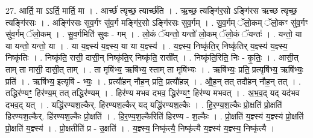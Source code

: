 \documentclass[17pt]{extarticle}
\begin{document}
27. आर्ति॒ मा ऽऽर्ति॒ मार्ति॒ मा । . आर्च्छ॑ त्यृच्छ॒ त्यार्च्छ॑ति । . ऋ॒च्छ॒ त्यङ्गि॑र॒सो ऽङ्गि॑रस ऋच्छ त्यृच्छ॒ त्यङ्गि॑रसः । . अङ्गि॑रसः सुव॒र्गꣳ सु॑व॒र्ग मङ्गि॑र॒सो ऽङ्गि॑रसः सुव॒र्गम् । . सु॒व॒र्गम् ॅलो॒कम् ॅलो॒कꣳ सु॑व॒र्गꣳ सु॑व॒र्गम् ॅलो॒कम् । . सु॒व॒र्गमिति॑ सुवः - गम् । . लो॒कं ॅयन्तो॒ यन्तो॑ लो॒कम् ॅलो॒कं ॅयन्तः॑ । . यन्तो॒ या या यन्तो॒ यन्तो॒ या । . या य॒ज्ञ्स्य॑ य॒ज्ञ्स्य॒ या या य॒ज्ञ्स्य॑ । . य॒ज्ञ्स्य॒ निष्कृ॑ति॒र् निष्कृ॑तिर् य॒ज्ञ्स्य॑ य॒ज्ञ्स्य॒ निष्कृ॑तिः । . निष्कृ॑ति॒ रासी॒ दासी॒न् निष्कृ॑ति॒र् निष्कृ॑ति॒ रासी᳚त् । . निष्कृ॑ति॒रिति॒ निः - कृ॒तिः॒ । . आसी॒त् ताम् ता मासी॒ दासी॒त् ताम् । . ता मृषि॑भ्य॒ ऋषि॑भ्य॒ स्ताम् ता मृषि॑भ्यः । . ऋषि॑भ्यः॒ प्रति॒ प्रत्यृषि॑भ्य॒ ऋषि॑भ्यः॒ प्रति॑ । . ऋषि॑भ्य॒ इत्यृषि॑ - भ्यः॒ । . प्रत्यौ॑हन् नौह॒न् प्रति॒ प्रत्यौ॑हन्न् । . औ॒ह॒न् तत् तदौ॑हन् नौह॒न् तत् । . तद्धिर॑ण्यꣳ॒॒ हिर॑ण्य॒म् तत् तद्धिर॑ण्यम् । . हिर॑ण्य मभव दभव॒ द्धिर॑ण्यꣳ॒॒ हिर॑ण्य मभवत् । . अ॒भ॒व॒द् यद् यद॑भव दभव॒द् यत् । . यद्धि॑रण्यश॒ल्कैर्. हि॑रण्यश॒ल्कैर् यद् यद्धि॑रण्यश॒ल्कैः । . हि॒र॒ण्य॒श॒ल्कैः प्रो॒क्षति॑ प्रो॒क्षति॑ हिरण्यश॒ल्कैर्. हि॑रण्यश॒ल्कैः प्रो॒क्षति॑ । . हि॒र॒ण्य॒श॒ल्कैरिति॑ हिरण्य - श॒ल्कैः । . प्रो॒क्षति॑ य॒ज्ञ्स्य॑ य॒ज्ञ्स्य॑ प्रो॒क्षति॑ प्रो॒क्षति॑ य॒ज्ञ्स्य॑ । . प्रो॒क्षतीति॑ प्र - उ॒क्षति॑ । . य॒ज्ञ्स्य॒ निष्कृ॑त्यै॒ निष्कृ॑त्यै य॒ज्ञ्स्य॑ य॒ज्ञ्स्य॒ निष्कृ॑त्यै । \newline
\end{document}
